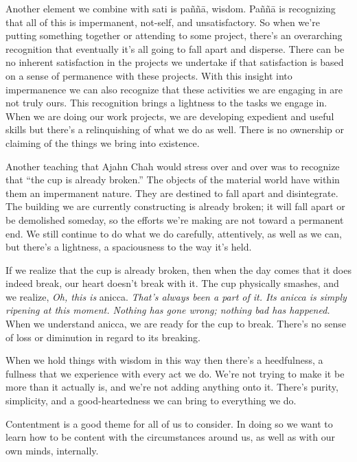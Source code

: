 Another element we combine with sati is paññā, wisdom. Paññā is 
recognizing that all of this is impermanent, not-self, and 
unsatisfactory. So when we're putting something together or attending 
to some project, there's an overarching recognition that eventually 
it's all going to fall apart and disperse. There can be no inherent 
satisfaction in the projects we undertake if that satisfaction is based 
on a sense of permanence with these projects. With this insight into 
impermanence we can also recognize that these activities we are 
engaging in are not truly ours. This recognition brings a lightness to 
the tasks we engage in. When we are doing our work projects, we are 
developing expedient and useful skills but there's a relinquishing of 
what we do as well. There is no ownership or claiming of the things we 
bring into existence.

Another teaching that Ajahn Chah would stress over and over was to 
recognize that ``the cup is already broken.'' The objects of the 
material world have within them an impermanent nature. They are 
destined to fall apart and disintegrate. The building we are currently 
constructing is already broken; it will fall apart or be demolished 
someday, so the efforts we're making are not toward a permanent end. We 
still continue to do what we do carefully, attentively, as well as we 
can, but there's a lightness, a spaciousness to the way it's held.

If we realize that the cup is already broken, then when the day comes 
that it does indeed break, our heart doesn't break with it. The cup 
physically smashes, and we realize, \emph{Oh, this is }anicca. 
\emph{That's always been a part of it. Its anicca is simply ripening at 
this moment. Nothing has gone wrong; nothing bad has happened.} When we 
understand anicca, we are ready for the cup to break. There's no sense 
of loss or diminution in regard to its breaking.

When we hold things with wisdom in this way then there's a heedfulness, 
a fullness that we experience with every act we do. We're not trying to 
make it be more than it actually is, and we're not adding anything onto 
it. There's purity, simplicity, and a good-heartedness we can bring to 
everything we do.


Contentment is a good theme for all of us to consider. In doing so we 
want to learn how to be content with the circumstances around us, as 
well as with our own minds, internally.

